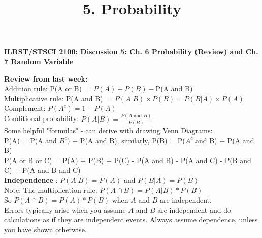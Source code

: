 \documentclass[12pt]{article}
\begin{document}
\title{5. Probability}
\begin{center} \textbf{ILRST/STSCI 2100: Discussion 5: Ch. 6 Probability (Review) and Ch. 7 Random Variable }
\end{center}

\noindent \textbf{Review from last week:} \\

Addition rule: P(A or B) $= P(A) + P(B) - $P(A and B)\\

Multiplicative rule: P(A and B) $= P(A|B) \times P(B) = P(B|A)\times P(A)$\\

Complement: $P(A^c) = 1 - P(A)$ \\

Conditional probability: $P(A|B) = \frac{P(A \text{ and } B)}{P(B)}$\\

\noindent Some helpful "formulas" - can derive with drawing Venn Diagrams: \\

\noindent P(A) = P(A and $B^c)$ + P(A and B), similarly, P(B) = P($A^c$ and B) + P(A and B)\\

\noindent P(A or B or C) = P(A) + P(B) + P(C) - P(A and B) - P(A and C) - P(B and C) + P(A and B and C)\\

\noindent \textbf{Independence} : $P(A|B) = P(A)$ and $P(B|A) = P(B)$ \\

\noindent Note: The multiplication rule: $P(A \cap B) = P(A|B) * P(B)$ \\ 

\noindent So $P(A \cap B) = P(A) * P(B)$ when $A$ and $B$ are independent. \\

\noindent Errors typically arise when you assume $A$ and $B$ are independent and do calculations as if they are independent events. Always assume dependence, unless you have shown otherwise. \\
\end{document}
